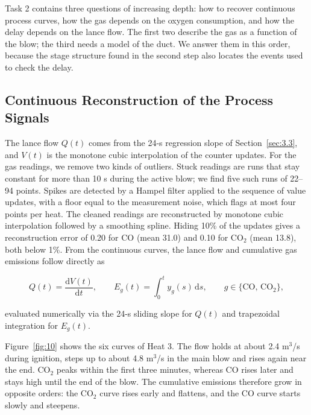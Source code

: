 Task 2 contains three questions of increasing depth: how to recover continuous process curves, how the gas depends on the oxygen consumption, and how the delay depends on the lance flow. The first two describe the gas as a function of the blow; the third needs a model of the duct. We answer them in this order, because the stage structure found in the second step also locates the events used to check the delay.

\subsection{Continuous Reconstruction of the Process Signals}\label{sec:6.1}

The lance flow $Q(t)$ comes from the 24-s regression slope of Section~\ref{sec:3.3}, and $V(t)$ is the monotone cubic interpolation of the counter updates. For the gas readings, we remove two kinds of outliers. Stuck readings are runs that stay constant for more than 10 s during the active blow; we find five such runs of 22–94 points. Spikes are detected by a Hampel filter applied to the sequence of value updates, with a floor equal to the measurement noise, which flags at most four points per heat. The cleaned readings are reconstructed by monotone cubic interpolation followed by a smoothing spline. Hiding 10\% of the updates gives a reconstruction error of 0.20 for CO (mean 31.0) and 0.10 for CO\ensuremath{_{2}} (mean 13.8), both below 1\%. From the continuous curves, the lance flow and cumulative gas emissions follow directly as

\begin{equation}
Q(t) = \frac{\mathrm{d}V(t)}{\mathrm{d}t}, \qquad E_g(t) = \int_{0}^{t} y_g(s)\,\mathrm{d}s, \qquad g \in \{\mathrm{CO},\,\mathrm{CO_2}\}, \label{eq:cum_emiss}
\end{equation}

evaluated numerically via the 24-s sliding slope for $Q(t)$ and trapezoidal integration for $E_g(t)$.

Figure~\ref{fig:10} shows the six curves of Heat 3. The flow holds at about 2.4 m\ensuremath{^{3}}/s during ignition, steps up to about 4.8 m\ensuremath{^{3}}/s in the main blow and rises again near the end. CO\ensuremath{_{2}} peaks within the first three minutes, whereas CO rises later and stays high until the end of the blow. The cumulative emissions therefore grow in opposite orders: the CO\ensuremath{_{2}} curve rises early and flattens, and the CO curve starts slowly and steepens.

